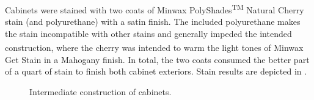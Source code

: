 \documentclass{StdTemplate} %
\begin{document}
%
Cabinets were stained with two coats of Minwax\textsuperscript{\textregistered} PolyShades\textsuperscript{TM} Natural Cherry stain (and polyurethane) with a satin finish. The included polyurethane makes the stain incompatible with other stains and generally impeded the intended construction, where the cherry was intended to warm the light tones of Minwax\textsuperscript{\textregistered} Get Stain in a Mahogany finish. In total, the two coats consumed the better part of a quart of stain to finish both cabinet exteriors. Stain results are depicted in .\par
%
\begin{figure}[h!]
\centering
{}
\qquad
{}
\caption{Intermediate construction of cabinets.}
\label{fig:sp_stain}
\end{figure}
\end{document}
